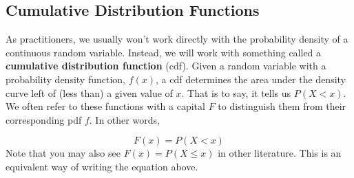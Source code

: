 \documentclass[
]{book}
\theoremstyle{definition}
\theoremstyle{definition}
\theoremstyle{definition}
\theoremstyle{definition}
\theoremstyle{remark}
\begin{document}
\subsection{Cumulative Distribution Functions}\label{cumulative-distribution-functions}

As practitioners, we usually won't work directly with the probability density of a continuous random variable. Instead, we will work with something called a \textbf{cumulative distribution function} (cdf). Given a random variable with a probability density function, \(f(x)\), a cdf determines the area under the density curve left of (less than) a given value of \(x\). That is to say, it tells us \(P(X < x)\). We often refer to these functions with a capital \(F\) to distinguish them from their corresponding pdf \(f\). In other words,

\[
F(x) = P(X < x)
\label{eq:cdfs}
\]
Note that you may also see \(F(x) = P(X \leq x)\) in other literature. This is an equivalent way of writing the equation above.
\end{document}
